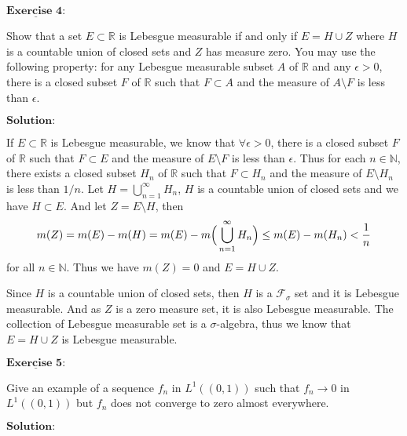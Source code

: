 \documentclass[12pt,a4paper]{ctexart}
\begin{document}
$\underline{\textbf{Exercise 4:}}$

Show that a set $E \subset \mathbb{R}$ is Lebesgue measurable if and only if $E = H \cup Z$ where $H$ is a countable union of closed sets and $Z$ has measure zero. You may use the following property: for any Lebesgue measurable subset $A$ of $\mathbb{R}$ and any $\epsilon > 0$, there is a closed subset $F$ of $\mathbb{R}$ such that $F \subset A$ and the measure of $A \setminus F$ is less than $\epsilon$.

\vspace{8pt}
$\textbf{Solution:}$

If $E \subset \mathbb{R}$ is Lebesgue measurable, we know that $\forall \epsilon > 0$, there is a closed subset $F$ of $\mathbb{R}$ such that $F \subset E$ and the measure of $E \setminus F$ is less than $\epsilon$. Thus for each $n \in \mathbb N$, there exists a closed subset $H_n$ of $\mathbb R$ such that $F \subset H_n$ and the measure of $E \setminus H_n$ is less than $1/n$. Let $H = \bigcup_{n=1}^{\infty} H_n$, $H$ is a countable union of closed sets and we have $H \subset E$. And let $Z = E \setminus H$, then
$$m(Z) = m(E) - m(H) = m(E) - m \Big{(} \bigcup_{n=1}^{\infty} H_n \Big{)} \leq m(E) - m(H_n) < \frac{1}{n}$$
for all $n \in \mathbb N$. Thus we have $m(Z) = 0$ and $E = H \cup Z$.

Since $H$ is a countable union of closed sets, then $H$ is a $\mathcal{F}_{\sigma}$ set and it is Lebesgue measurable. And as $Z$ is a zero measure set, it is also Lebesgue measurable. The collection of Lebesgue measurable set is a $\sigma$-algebra, thus we know that $E = H \cup Z$ is Lebesgue measurable.

\newpage

$\underline{\textbf{Exercise 5:}}$

Give an example of a sequence $f_{n}$ in $L^{1} ((0, 1))$ such that $f_{n} \to 0$ in $L^{1}((0, 1))$ but $f_{n}$ does not converge to zero almost everywhere.

\vspace{8pt}
$\textbf{Solution:}$
\end{document}
